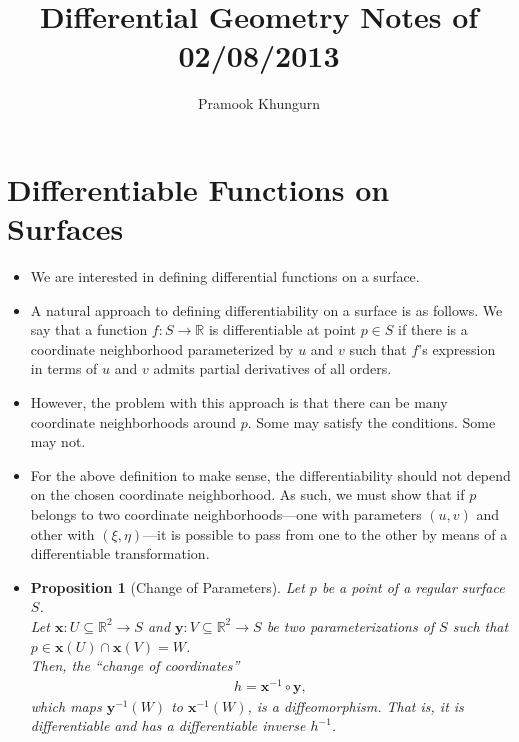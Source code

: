 \documentclass[10pt]{article}
\title{Differential Geometry Notes of 02/08/2013}
\author{Pramook Khungurn}
\newtheorem{proposition}[lemma]{Proposition}
\newcommand{\ve}[1]{\mathbf{#1}}
\newcommand{\ra}{\rightarrow}
\newcommand{\Real}{\mathbb{R}}
\newcommand{\sseq}{\subseteq}
\begin{document}
  \maketitle

  \section{Differentiable Functions on Surfaces} %
  \label{sec:differentiable_functions_on_surfaces}

  \begin{itemize}
    \item We are interested in defining differential functions on a surface.

    \item A natural approach to defining differentiability on a surface is as follows. We say that a function $f: S \ra \Real$ is differentiable at point $p \in S$ if there is a coordinate neighborhood parameterized by $u$ and $v$ such that $f$'s expression in terms of $u$ and $v$ admits partial derivatives of all orders.

    \item However, the problem with this approach is that there can be many coordinate neighborhoods around $p$. Some may satisfy the conditions. Some may not.

    \item For the above definition to make sense, the differentiability should not depend on the chosen coordinate neighborhood. As such, we must show that if $p$ belongs to two coordinate neighborhoods---one with parameters $(u,v)$ and other with $(\xi, \eta)$---it is possible to pass from one to the other by means of a differentiable transformation.

    \item \begin{proposition}[Change of Parameters]
      Let $p$ be a point of a regular surface $S$.\\
      Let $\ve{x}:U \sseq \Real^2 \ra S$ and $\ve{y}:V \sseq \Real^2 \ra S$ be two parameterizations of $S$ such that $p \in \ve{x}(U) \cap \ve{x}(V) = W$.\\
      Then, the ``change of coordinates''
      \begin{align*}
        h = \ve{x}^{-1} \circ \ve{y},
      \end{align*}
      which maps $\ve{y}^{-1}(W)$ to $\ve{x}^{-1}(W)$, is a diffeomorphism. That is, it is differentiable and has a differentiable inverse $h^{-1}$.
    \end{proposition}


\end{itemize}
\end{document}
